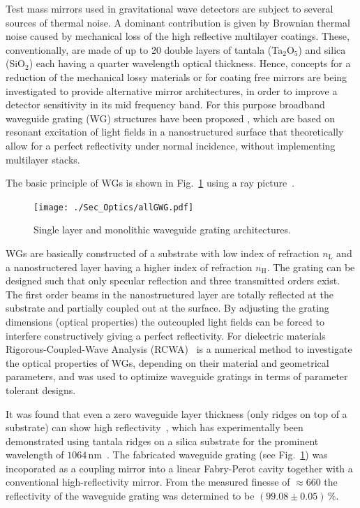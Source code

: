Test mass mirrors used in gravitational wave detectors are subject to several sources of thermal noise. A dominant contribution is given by Brownian thermal noise caused by mechanical loss of the high reflective multilayer coatings. These, conventionally, are made of up to 20 double layers of tantala (Ta$_2$O$_5$) and silica (SiO$_2$) each having a quarter wavelength optical thickness. Hence, concepts for a reduction of the mechanical lossy materials or for coating free mirrors are being investigated to provide alternative mirror architectures, in order to improve a detector sensitivity in its mid frequency band. For this purpose broadband waveguide grating (WG) structures have been proposed \cite{Bunkowski2006a}, which are based on resonant excitation of light fields in a nanostructured surface that theoretically allow for a perfect reflectivity under normal incidence, without implementing  multilayer stacks.

The basic principle of WGs is shown in Fig.~\ref{fig:WG} using a ray picture~\cite{Rosenblatt97}.

\begin{figure}
\centering
\texttt{[image: ./Sec\_Optics/allGWG.pdf]}
\caption{Single layer and monolithic waveguide grating architectures.}
\label{fig:WG}
\end{figure}

WGs are basically constructed of a substrate with low index of refraction $n_\mathrm{L}$ and  a nanostructered layer having a higher index of refraction $n_\mathrm{H}$. The grating can be designed such that only specular reflection and three transmitted orders exist. The first order beams in the nanostructured layer are totally reflected at the substrate and partially coupled out at the surface. By adjusting the grating dimensions (optical properties) the outcoupled light fields can be forced to interfere constructively giving a perfect reflectivity.   For dielectric materials Rigorous-Coupled-Wave Analysis (RCWA)~\cite{Moharam1981} is a numerical method to investigate the optical properties of WGs, depending on their material and geometrical parameters, and was used to optimize waveguide gratings in terms of parameter tolerant designs.

It was found that even a zero waveguide layer thickness (only ridges on top of a substrate) can show high reflectivity~\cite{Bunkowski2006a}, which has experimentally been demonstrated using tantala ridges on a silica substrate for the prominent wavelength of $1064\,$nm~\cite{Bruckner2009}. The fabricated waveguide grating (see Fig.~\ref{fig:WG}) was incoporated as a coupling mirror into a linear Fabry-Perot cavity together with a conventional high-reflectivity mirror. From the measured finesse of $\approx 660$ the reflectivity of the waveguide grating was determined to be $(99.08\pm 0.05)\,\%$.

